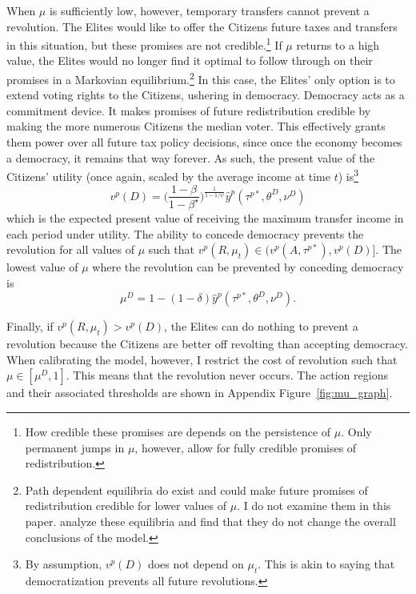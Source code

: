 When $\mu$ is sufficiently low, however, temporary transfers cannot prevent a revolution. The Elites would like to offer the Citizens future taxes and transfers in this situation, but these promises are not credible.\footnote{How credible these promises are depends on the persistence of $\mu$. Only permanent jumps in $\mu$, however, allow for fully credible promises of redistribution.} If $\mu$ returns to a high value, the Elites would no longer find it optimal to follow through on their promises in a Markovian equilibrium.\footnote{Path dependent equilibria do exist and could make future promises of redistribution credible for lower values of $\mu$. I do not examine them in this paper. \citet{Acemoglu2006} analyze these equilibria and find that they do not change the overall conclusions of the model.} In this case, the Elites' only option is to extend voting rights to the Citizens, ushering in democracy. Democracy acts as a commitment device. It makes promises of future redistribution credible by making the more numerous Citizens the median voter. This effectively grants them power over all future tax policy decisions, since once the economy becomes a democracy, it remains that way forever. As such, the present value of the Citizens' utility (once again, scaled by the average income at time $t$) is\footnote{By assumption, $v^{p}(D)$ does not depend on $\mu_t$. This is akin to saying that democratization prevents all future revolutions.}
\begin{equation}
v^{p}(D)=\bigg(\frac{1-\beta}{1-\beta^{\star}}\bigg)^{\frac{1}{1-1/\psi}}\hat{y}^{p} (\tau^{p*},\theta^{D},\nu^D)\label{eq:democracy}
\end{equation}
which is the expected present value of receiving the maximum transfer income in each period under \citeauthor{Epstein1989} utility. The ability to concede democracy prevents the revolution for all values of $\mu$ such that $v^p(R,\mu_{t}) \in (v^{p}(A,\tau^{p*}),v^{p}(D)]$. The lowest value of $\mu$ where the revolution can be prevented by conceding democracy is
\begin{equation}
\mu^{D} =1-(1-\delta)\hat{y}^{p} (\tau^{p*},\theta^{D},\nu^D).\label{eq:mudoublestar}
\end{equation}

Finally, if $v^p(R,\mu_{t}) > v^{p}(D)$, the Elites can do nothing to prevent a revolution because the Citizens are better off revolting than accepting democracy. When calibrating the model, however, I restrict the cost of revolution such that $\mu \in [\mu^{D},1]$. This means that the revolution never occurs. The action regions and their associated thresholds are shown in Appendix Figure~\ref{fig:mu_graph}.


